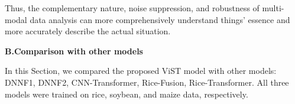 \documentclass[acmsmall, screen]{acmart}
\begin{document}
Thus, the complementary nature, noise suppression, and robustness of multi-modal data analysis can more comprehensively understand things’ essence and more accurately describe the actual situation.




\textbf{B.Comparison with other models}

In this Section, we compared the proposed ViST model with other models: DNNF1, DNNF2, CNN-Transformer, Rice-Fusion, Rice-Transformer. All three models were trained on rice, soybean, and maize data, respectively.

\begin{table}[htbp]
  \centering
  \caption{The comparative experimental test results of rice. The "Mean" and "Std" represent the mean value and standard deviation, respectively, of the results obtained from five experimental groups.}
\end{table}
\end{document}
